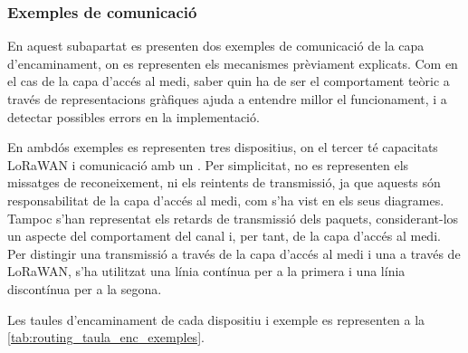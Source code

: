 \documentclass{tfgitic}[2024/07/01]
\begin{document}
{\subsubsection{Exemples de comunicació}
En aquest subapartat es presenten dos exemples de comunicació de la capa d'encaminament, on es representen els mecanismes prèviament explicats. Com en el cas de la capa d'accés al medi, saber quin ha de ser el comportament teòric a través de representacions gràfiques ajuda a entendre millor el funcionament, i a detectar possibles errors en la implementació. 

En ambdós exemples es representen tres dispositius, on el tercer té capacitats LoRaWAN i comunicació amb un . Per simplicitat, no es representen els missatges de reconeixement, ni els reintents de transmissió, ja que aquests són responsabilitat de la capa d'accés al medi, com s'ha vist en els seus diagrames. Tampoc s'han representat els retards de transmissió dels paquets, considerant-los un aspecte del comportament del canal i, per tant, de la capa d'accés al medi. Per distingir una transmissió a través de la capa d'accés al medi i una a través de LoRaWAN, s'ha utilitzat una línia contínua per a la primera i una línia discontínua per a la segona.

Les taules d'encaminament de cada dispositiu i exemple es representen a la \autoref{tab:routing_taula_enc_exemples}.

}
\end{document}
